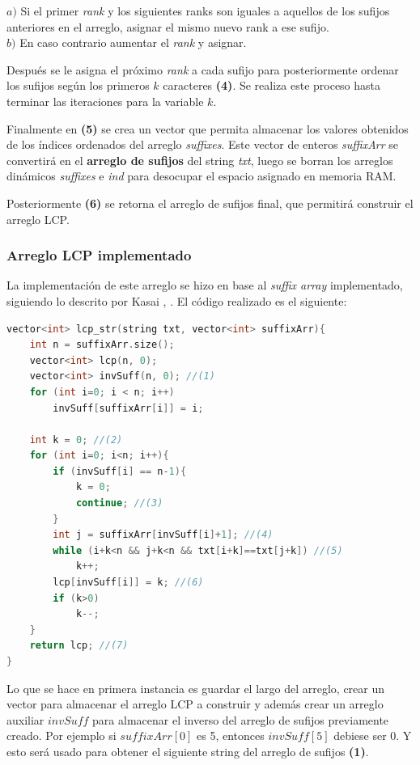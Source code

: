 $a)$ Si el primer \textit{rank} y los siguientes ranks son iguales a aquellos de los sufijos anteriores en el arreglo, asignar el mismo nuevo rank a ese sufijo.\\
$b)$ En caso contrario aumentar el \textit{rank} y asignar.

Después se le asigna el próximo \textit{rank} a cada sufijo para posteriormente ordenar los sufijos según los primeros $k$ caracteres \textbf{(4)}. Se realiza este proceso hasta terminar las iteraciones para la variable $k$.

Finalmente en \textbf{(5)} se crea un vector que permita almacenar los valores obtenidos de los índices ordenados del arreglo \textit{suffixes}. Este vector de enteros \textit{suffixArr} se convertirá en el \textbf{arreglo de sufijos} del string \textit{txt}, luego se borran los arreglos dinámicos \textit{suffixes} e \textit{ind} para desocupar el espacio asignado en memoria RAM.

Posteriormente \textbf{(6)} se retorna el arreglo de sufijos final, que permitirá construir el arreglo LCP.

\subsubsection{Arreglo LCP implementado}

La implementación de este arreglo se hizo en base al \textit{suffix array} implementado, siguiendo lo descrito por Kasai \cite{kasaimethod}, \cite{kasai}. El código realizado es el siguiente:

\begin{lstlisting}[language=C++, caption=Función principal arreglo LCP (1)]
vector<int> lcp_str(string txt, vector<int> suffixArr){
	int n = suffixArr.size();
	vector<int> lcp(n, 0);
	vector<int> invSuff(n, 0); //(1)
	for (int i=0; i < n; i++)
		invSuff[suffixArr[i]] = i;

	int k = 0; //(2)
	for (int i=0; i<n; i++){
		if (invSuff[i] == n-1){
			k = 0;
			continue; //(3)
		}
		int j = suffixArr[invSuff[i]+1]; //(4)
		while (i+k<n && j+k<n && txt[i+k]==txt[j+k]) //(5)
			k++;
		lcp[invSuff[i]] = k; //(6)
		if (k>0)
			k--;
	}
	return lcp; //(7)
}

\end{lstlisting}

Lo que se hace en primera instancia es guardar el largo del arreglo, crear un vector para almacenar el arreglo LCP a construir y además crear un arreglo auxiliar $invSuff$ para almacenar el inverso del arreglo de sufijos previamente creado. Por ejemplo si $suffixArr[0]$ es 5, entonces $invSuff[5]$ debiese ser 0. Y esto será usado para obtener el siguiente string del arreglo de sufijos \textbf{(1)}.

